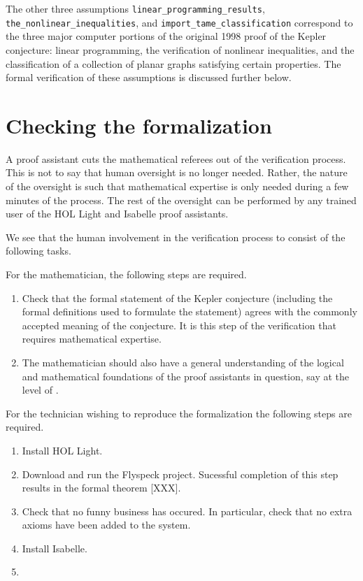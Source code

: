 The other three assumptions 
\verb!linear_programming_results!, 
\verb!the_nonlinear_inequalities!, and \verb!import_tame_classification!
correspond to the three major computer portions of the original 1998 proof of the Kepler conjecture: linear programming,
the verification of nonlinear inequalities, and the classification of a collection of planar graphs satisfying certain properties.
The formal verification of these assumptions is discussed further below.


\section{Checking the formalization}

A proof assistant cuts the mathematical referees out of the verification
process. 
This is not to say that human oversight is no longer needed.  Rather,
the nature of the oversight is such that mathematical expertise is only needed
during a few minutes of the process.  The rest of the oversight can be performed
by any trained user of the HOL Light and Isabelle proof assistants.

We see that the human involvement in the verification process to consist of the following tasks.

For the mathematician, the following steps are required.

\begin{enumerate}
\item Check that the formal statement of the Kepler conjecture (including the formal definitions used to
formulate the statement) agrees with the commonly accepted
meaning of the conjecture.  It is this step of the verification that requires mathematical expertise.
\item The mathematician should also have a general understanding of 
the logical and mathematical foundations of the proof
assistants in question, say at the level of \cite{Bourbaki}.
\end{enumerate}

For the technician wishing to reproduce the formalization the following steps are required.

\begin{enumerate}
\item  Install HOL Light.
\item Download and run the Flyspeck project.  Sucessful completion of this step results in the
formal theorem [XXX].
\item Check that no funny business has occured.  In particular, check that no extra axioms have been added to the system.
\item Install Isabelle.
\item 
\end{enumerate}

